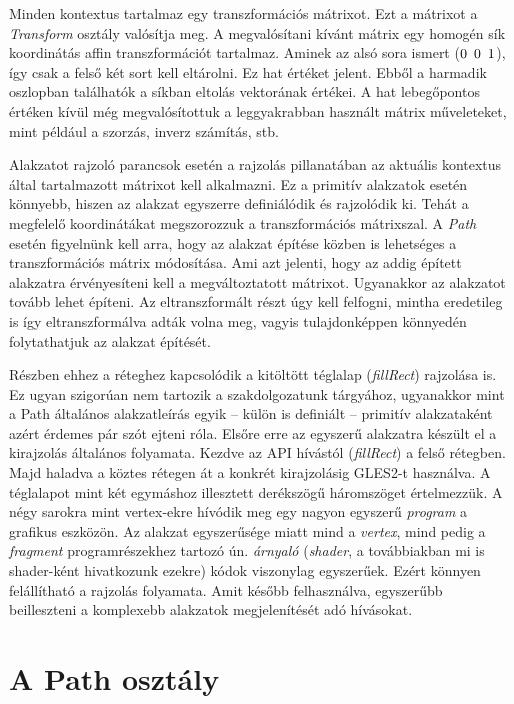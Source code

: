 \documentclass[12pt]{report}
\theoremstyle{definition}
\newcommand{\inenglish}[1]{\textsl{#1}}
\newcommand{\func}[1]{{\textsl{#1}}}
\begin{document}
Minden kontextus tartalmaz egy transzformációs mátrixot. Ezt a mátrixot a
\func{Transform} osztály valósítja meg. A megvalósítani kívánt mátrix egy
homogén sík koordinátás affin transzformációt tartalmaz. Aminek az alsó sora
ismert ($0\enskip 0\enskip 1$), így csak a felső két sort kell eltárolni. Ez
hat értéket jelent. Ebből a harmadik oszlopban találhatók a síkban eltolás
vektorának értékei. A hat lebegőpontos értéken kívül még megvalósítottuk a
leggyakrabban használt mátrix műveleteket, mint például a szorzás, inverz
számítás, stb.

Alakzatot rajzoló parancsok esetén a rajzolás pillanatában az aktuális
kontextus által tartalmazott mátrixot kell alkalmazni. Ez a primitív alakzatok
esetén könnyebb, hiszen az alakzat egyszerre definiálódik és rajzolódik ki.
Tehát a megfelelő koordinátákat megszorozzuk a transzformációs mátrixszal. A
\emph{Path} esetén figyelnünk kell arra, hogy az alakzat építése közben is
lehetséges a transzformációs mátrix módosítása. Ami azt jelenti, hogy az addig
épített alakzatra érvényesíteni kell a megváltoztatott mátrixot. Ugyanakkor az
alakzatot tovább lehet építeni. Az eltranszformált részt úgy kell felfogni,
mintha eredetileg is így eltranszformálva adták volna meg, vagyis
tulajdonképpen könnyedén folytathatjuk az alakzat építését.

Részben ehhez a réteghez kapcsolódik a kitöltött téglalap (\func{fillRect})
rajzolása is. Ez ugyan szigorúan nem tartozik a szakdolgozatunk tárgyához,
ugyanakkor mint a Path általános alakzatleírás egyik -- külön is definiált --
primitív alakzataként azért érdemes pár szót ejteni róla. Elsőre erre az
egyszerű alakzatra készült el a kirajzolás általános folyamata. Kezdve az API
hívástól (\func{fillRect}) a felső rétegben. Majd haladva a köztes rétegen át a
konkrét kirajzolásig GLES2-t használva. A téglalapot mint két egymáshoz
illesztett derékszögű háromszöget értelmezzük. A négy sarokra mint vertex-ekre
hívódik meg egy nagyon egyszerű \emph{program} a grafikus eszközön. Az alakzat
egyszerűsége miatt mind a \emph{vertex}, mind pedig a \emph{fragment}
programrészekhez tartozó ún. \emph{árnyaló} (\inenglish{shader}, a továbbiakban
mi is shader-ként hivatkozunk ezekre) kódok viszonylag egyszerűek. Ezért
könnyen felállítható a rajzolás folyamata. Amit később felhasználva, egyszerűbb
beilleszteni a komplexebb alakzatok megjelenítését adó hívásokat.

    \section[A Path osztály]{A Path osztály}
    \label{sec:A Path_osztály}
\end{document}
